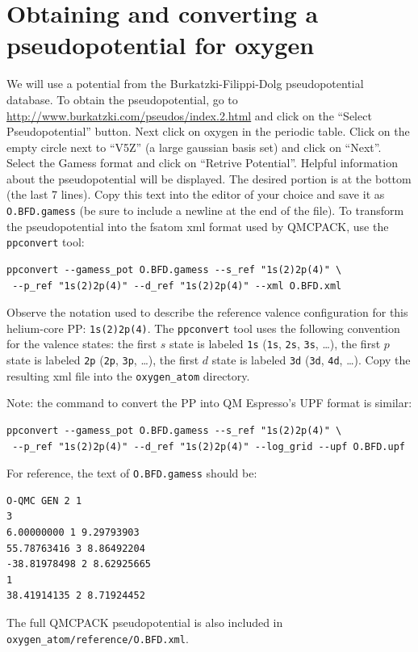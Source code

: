 \section{Obtaining and converting a pseudopotential for oxygen}\label{sec:lqb_pseudo}
We will use a potential from the Burkatzki-Filippi-Dolg pseudopotential database.  To obtain the pseudopotential, go to 
\href{http://www.burkatzki.com/pseudos/index.2.html}{http://www.burkatzki.com/pseudos/index.2.html}
and click on the ``Select Pseudopotential'' button.  Next click on oxygen in the 
periodic table.  Click on the empty circle next to ``V5Z'' (a large gaussian 
basis set) and click on ``Next''.  Select the Gamess format and click on 
``Retrive Potential''.  Helpful information about the pseudopotential will be 
displayed.  The desired portion is at the bottom (the last 7 lines).  Copy 
this text into the editor of your choice and save it as \texttt{O.BFD.gamess} 
(be sure to include a newline at the end of the file).  To transform the 
pseudopotential into the fsatom xml format used by QMCPACK, use the \texttt{ppconvert} 
tool:
\begin{shaded}
\begin{verbatim}
ppconvert --gamess_pot O.BFD.gamess --s_ref "1s(2)2p(4)" \
 --p_ref "1s(2)2p(4)" --d_ref "1s(2)2p(4)" --xml O.BFD.xml
\end{verbatim}
\end{shaded}
\noindent
Observe the notation used to describe the reference valence configuration for this helium-core PP: \texttt{1s(2)2p(4)}.  The \texttt{ppconvert} tool uses the following convention for the valence states: the first $s$ state is labeled \texttt{1s} (\texttt{1s}, \texttt{2s}, \texttt{3s}, \ldots), the first $p$ state is labeled \texttt{2p} (\texttt{2p}, \texttt{3p}, \ldots), the first $d$ state is labeled \texttt{3d} (\texttt{3d}, \texttt{4d}, \ldots). Copy the resulting xml file into the \texttt{oxygen\_atom} directory.

Note: the command to convert the PP into QM Espresso's UPF format is similar:
\begin{shaded}
\begin{verbatim}
ppconvert --gamess_pot O.BFD.gamess --s_ref "1s(2)2p(4)" \
 --p_ref "1s(2)2p(4)" --d_ref "1s(2)2p(4)" --log_grid --upf O.BFD.upf
\end{verbatim}
\end{shaded}

For reference, the text of \texttt{O.BFD.gamess} should be:
\begin{lstlisting}
O-QMC GEN 2 1
3
6.00000000 1 9.29793903
55.78763416 3 8.86492204
-38.81978498 2 8.62925665
1
38.41914135 2 8.71924452

\end{lstlisting}
\noindent
The full QMCPACK pseudopotential is also included in \texttt{oxygen\_atom/reference/O.BFD.xml}.


